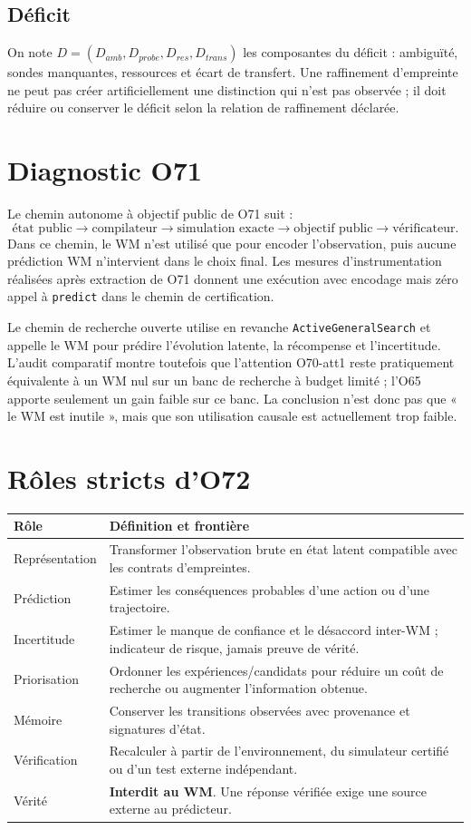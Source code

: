 \documentclass[11pt,a4paper]{article}
\begin{document}
\subsection{Déficit}
On note $D=(D_{amb},D_{probe},D_{res},D_{trans})$ les composantes du déficit : ambiguïté, sondes manquantes, ressources et écart de transfert. Une raffinement d'empreinte ne peut pas créer artificiellement une distinction qui n'est pas observée ; il doit réduire ou conserver le déficit selon la relation de raffinement déclarée.
\section{Diagnostic O71}
Le chemin autonome à objectif public de O71 suit :
\[
\text{état public}\rightarrow\text{compilateur}\rightarrow\text{simulation exacte}\rightarrow\text{objectif public}\rightarrow\text{vérificateur}.
\]
Dans ce chemin, le WM n'est utilisé que pour encoder l'observation, puis aucune prédiction WM n'intervient dans le choix final. Les mesures d'instrumentation réalisées après extraction de O71 donnent une exécution avec encodage mais zéro appel à \texttt{predict} dans le chemin de certification.

Le chemin de recherche ouverte utilise en revanche \texttt{ActiveGeneralSearch} et appelle le WM pour prédire l'évolution latente, la récompense et l'incertitude. L'audit comparatif montre toutefois que l'attention O70-att1 reste pratiquement équivalente à un WM nul sur un banc de recherche à budget limité ; l'O65 apporte seulement un gain faible sur ce banc. La conclusion n'est donc pas que « le WM est inutile », mais que son utilisation causale est actuellement trop faible.
\section{Rôles stricts d'O72}
\begin{longtable}{p{}p{}}
\toprule
Rôle & Définition et frontière \\
\midrule
Représentation & Transformer l'observation brute en état latent compatible avec les contrats d'empreintes. \\
Prédiction & Estimer les conséquences probables d'une action ou d'une trajectoire. \\
Incertitude & Estimer le manque de confiance et le désaccord inter-WM ; indicateur de risque, jamais preuve de vérité. \\
Priorisation & Ordonner les expériences/candidats pour réduire un coût de recherche ou augmenter l'information obtenue. \\
Mémoire & Conserver les transitions observées avec provenance et signatures d'état. \\
Vérification & Recalculer à partir de l'environnement, du simulateur certifié ou d'un test externe indépendant. \\
Vérité & \textbf{Interdit au WM}. Une réponse vérifiée exige une source externe au prédicteur. \\
\bottomrule
\end{longtable}
\end{document}
